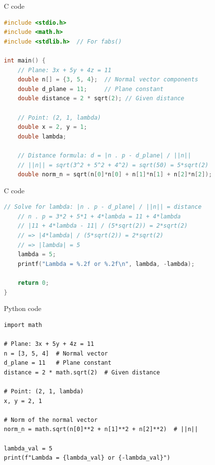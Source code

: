 \documentclass{beamer}
\begin{document}
\begin{frame}[fragile]{C code}
\begin{lstlisting}[language = c]
#include <stdio.h>
#include <math.h>
#include <stdlib.h>  // For fabs()

int main() {
    // Plane: 3x + 5y + 4z = 11
    double n[] = {3, 5, 4};  // Normal vector components
    double d_plane = 11;     // Plane constant
    double distance = 2 * sqrt(2); // Given distance

    // Point: (2, 1, lambda)
    double x = 2, y = 1;
    double lambda;

    // Distance formula: d = |n . p - d_plane| / ||n||
    // ||n|| = sqrt(3^2 + 5^2 + 4^2) = sqrt(50) = 5*sqrt(2)
    double norm_n = sqrt(n[0]*n[0] + n[1]*n[1] + n[2]*n[2]); 
\end{lstlisting}
\end{frame}

\begin{frame}[fragile]{C code}
\begin{lstlisting}[language = c]
    // Solve for lambda: |n . p - d_plane| / ||n|| = distance
    // n . p = 3*2 + 5*1 + 4*lambda = 11 + 4*lambda
    // |11 + 4*lambda - 11| / (5*sqrt(2)) = 2*sqrt(2)
    // => |4*lambda| / (5*sqrt(2)) = 2*sqrt(2)
    // => |lambda| = 5
    lambda = 5;
    printf("Lambda = %.2f or %.2f\n", lambda, -lambda);

    return 0;
}
\end{lstlisting}
\end{frame}

\begin{frame}[fragile]{Python code}
\begin{lstlisting}
import math

# Plane: 3x + 5y + 4z = 11
n = [3, 5, 4]  # Normal vector
d_plane = 11   # Plane constant
distance = 2 * math.sqrt(2)  # Given distance

# Point: (2, 1, lambda)
x, y = 2, 1

# Norm of the normal vector
norm_n = math.sqrt(n[0]**2 + n[1]**2 + n[2]**2)  # ||n||

lambda_val = 5
print(f"Lambda = {lambda_val} or {-lambda_val}")

\end{lstlisting}
\end{frame}
\end{document}
